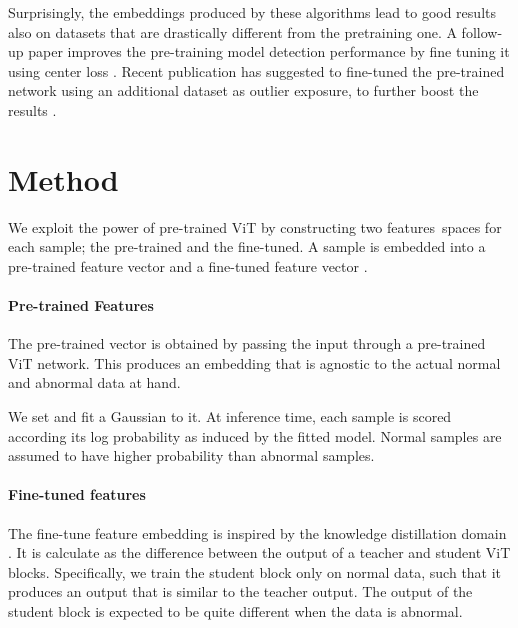 \documentclass[10pt,twocolumn,letterpaper]{article}
\begin{document}
Surprisingly, the embeddings produced by these algorithms lead to good results also on datasets that are drastically different from the pretraining one. 
A follow-up paper improves the pre-training model detection performance by fine tuning it using center loss \cite{reiss2020panda}. Recent publication has suggested to fine-tuned the pre-trained network using an additional dataset as outlier exposure, to further boost the results \cite{deecke2021transfer}.


















%
 
\section{Method}

We exploit the power of pre-trained ViT by constructing two features spaces for each sample; the pre-trained and the fine-tuned. A sample  is embedded into a pre-trained feature vector  and a fine-tuned feature vector . 





\paragraph{Pre-trained Features} \label{SubSectionGM}
The pre-trained vector  is obtained by passing the input  through a pre-trained ViT network. This produces an embedding that is agnostic to the actual normal and abnormal data at hand.

We set  and fit a Gaussian to it. At inference time, each sample is scored according its log probability as induced by the fitted model. Normal samples are assumed to have higher probability than abnormal samples.

\paragraph{Fine-tuned features} \label{SubSectionBOP}


The fine-tune feature embedding is inspired by the knowledge distillation domain \cite{wang2021knowledge}. It is calculate as the difference between the output of a teacher and student ViT blocks. Specifically, we train the student block only on normal data, such that it produces an output that is similar to the teacher output. The output of the student block is expected to be quite different when the data is abnormal.
\end{document}
